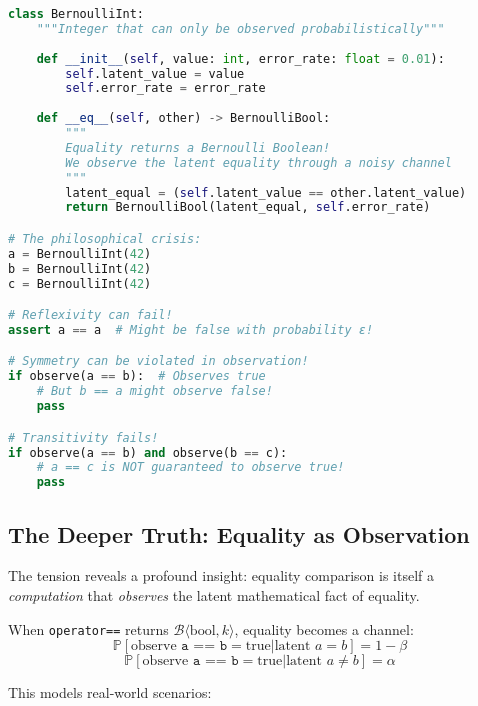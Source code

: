 \begin{lstlisting}[language=Python, caption={Bernoulli equality breaks regular type assumptions}]
class BernoulliInt:
    """Integer that can only be observed probabilistically"""
    
    def __init__(self, value: int, error_rate: float = 0.01):
        self.latent_value = value
        self.error_rate = error_rate
    
    def __eq__(self, other) -> BernoulliBool:
        """
        Equality returns a Bernoulli Boolean!
        We observe the latent equality through a noisy channel
        """
        latent_equal = (self.latent_value == other.latent_value)
        return BernoulliBool(latent_equal, self.error_rate)

# The philosophical crisis:
a = BernoulliInt(42)
b = BernoulliInt(42)
c = BernoulliInt(42)

# Reflexivity can fail!
assert a == a  # Might be false with probability ε!

# Symmetry can be violated in observation!
if observe(a == b):  # Observes true
    # But b == a might observe false!
    pass

# Transitivity fails!
if observe(a == b) and observe(b == c):
    # a == c is NOT guaranteed to observe true!
    pass
\end{lstlisting}

\subsection{The Deeper Truth: Equality as Observation}

The tension reveals a profound insight: equality comparison is itself a \textit{computation} that \textit{observes} the latent mathematical fact of equality.

\begin{theorem}
When \texttt{operator==} returns $\mathcal{B}\langle\text{bool}, k\rangle$, equality becomes a channel:
\begin{equation}
\mathbb{P}[\text{observe } \texttt{a == b} = \text{true} | \text{latent } a = b] = 1 - \beta
\end{equation}
\begin{equation}
\mathbb{P}[\text{observe } \texttt{a == b} = \text{true} | \text{latent } a \neq b] = \alpha
\end{equation}
\end{theorem}

This models real-world scenarios:

